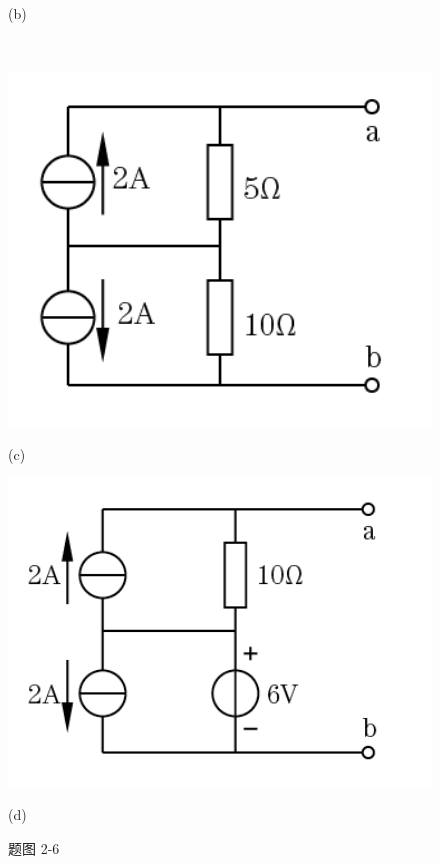 \documentclass[hyperref, UTF8]{ctexart}
\begin{document}
\begin{figure}[!htb]
\begin{minipage}[t]{0.195\textwidth}
    \caption*{(b)}
  \end{minipage} \\
  \centering
  \begin{minipage}[t]{0.221\textwidth}
    \centering
    \includegraphics[width=1\textwidth]{p2-6-c.png}
    \caption*{(c)}
  \end{minipage}
  \begin{minipage}[t]{0.253\textwidth}
    \centering
    \includegraphics[width=1\textwidth]{p2-6-d.png}
    \caption*{(d)}
  \end{minipage}
  \caption*{题图 2-6}
\end{figure}
\end{document}
